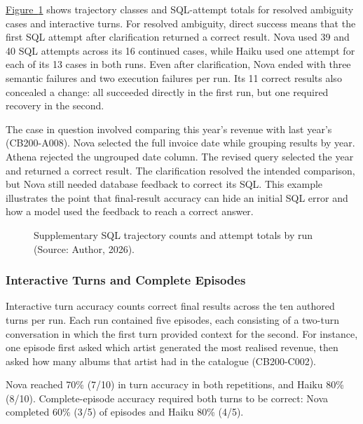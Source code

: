 \hyperref[fig:results-supplementary-trajectories]{Figure~\ref*{fig:results-supplementary-trajectories}}
shows trajectory classes and SQL-attempt totals for resolved ambiguity cases
and interactive turns.
For resolved ambiguity, direct success means that the first SQL attempt after clarification returned a correct result.
Nova used 39 and 40 SQL attempts across its 16 continued cases, while Haiku
used one attempt for each of its 13 cases in both runs.
Even after clarification, Nova ended with three semantic failures and two
execution failures per run.
Its 11 correct results also concealed a change: all succeeded directly in
the first run, but one required recovery in the second.

The case in question involved comparing this year's revenue with last year's (CB200-A008).
Nova selected the full invoice date while grouping results by year.
Athena rejected the ungrouped date column.
The revised query selected the year and returned a correct result.
The clarification resolved the intended comparison,
but Nova still needed database feedback to correct its SQL.
This example illustrates the point that final-result accuracy can hide
an initial SQL error and how a model used the feedback to reach a correct answer.

\begin{figure}[H]
\centering

\caption{Supplementary SQL trajectory counts and attempt totals by run (Source: Author, 2026).}
\label{fig:results-supplementary-trajectories}
\end{figure}

\subsubsection{Interactive Turns and Complete Episodes}

Interactive turn accuracy counts correct final results across the ten authored
turns per run. 
Each run contained five episodes, each consisting of a two-turn conversation
in which the first turn provided context for the second.
For instance, one episode first asked which artist generated the most realised
revenue, then asked how many albums that artist had in the catalogue (CB200-C002).

Nova reached 70\% (7/10) in turn accuracy in both repetitions, and Haiku 80\% (8/10).
Complete-episode accuracy required both turns to be correct:
Nova completed 60\% (3/5) of episodes and Haiku 80\% (4/5).

